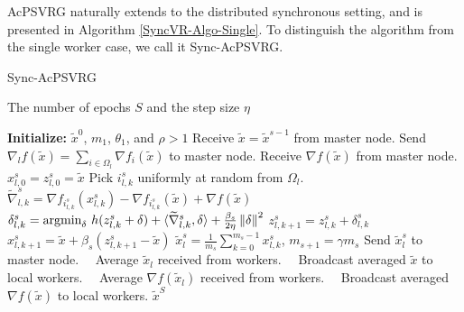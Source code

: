 AcPSVRG naturally extends to the distributed synchronous
setting,  and  is  presented  in  Algorithm  \ref{SyncVR-Algo-Single}.  To  distinguish  the
algorithm from the single worker case, we call it Sync-AcPSVRG. 
\begin{algorithm}[H]
\caption{Sync-AcPSVRG}\label{SyncVR-Algo-Single}
\begin{algorithmic}
\renewcommand{\algorithmicrequire}{\textbf{Input:}}
 \renewcommand{\algorithmicensure}{\textbf{Output:}}
  \newcommand{\INITIALIZE}{\item[\textbf{Initialize:}]}
\REQUIRE The number of epochs $S$ and the step size $\eta$
\INITIALIZE $\widetilde{x}^0$, $m_1$, $\theta_1$, and $\rho > 1$
\STATE Receive $\widetilde{x} = \widetilde{x}^{s-1}$ from master node.
\STATE  Send $\nabla_l f(\widetilde{x}) = \sum_{i\in\Omega_l}\nabla f_i(\widetilde{x})$ to master node.
\STATE  Receive $\nabla f(\widetilde{x})$ from master node.
 \STATE $x_{l,0}^s = z_{l,0}^s = \widetilde{x}$
 \STATE Pick $i_{l,k}^s$ uniformly at random from $\Omega_l$.
 \STATE $\widetilde{\nabla}_{l,k}^s = \nabla f_{i_{l,k}^s}(x_{l,k}^s) - \nabla f_{i_{l,k}^s}(\widetilde{x}) + \nabla f(\widetilde{x})$
 \STATE $\delta_{l,k}^s = \text{argmin}_{\delta}\,\,h(z_{l,k}^s+\delta)+\langle\widetilde{\nabla}_{l,k}^s,\delta\rangle + \frac{{\beta_s}}{2\eta}\left\lVert\delta\right\rVert^2$
 \STATE $z_{l,k+1}^s = z_{l,k}^s + \delta_{l,k}^s$
 \STATE $x_{l,k+1}^s = \widetilde{x}+\beta_s(z_{l,k+1}^s-\widetilde{x})$
 \ENDFOR
\STATE $\widetilde{x}_{l}^s = \frac{1}{m_s}\sum_{k=0}^{m_s-1} x_{l,k}^s$, $m_{s+1} = \gamma m_s$
\STATE Send $\widetilde{x}_{l}^s$ to master node.
 \ENDFOR
 \ENDFOR
 \STATE\qquad\,\,\,\, Average $\widetilde{x}_l$ received from workers.
  \STATE\qquad\,\,\,\, Broadcast averaged $\widetilde{x}$ to local workers.
  \STATE\qquad\,\,\,\, Average $\nabla f(\widetilde{x}_l)$ received from workers.
  \STATE\qquad\,\,\,\, Broadcast averaged $\nabla f(\widetilde{x})$ to local workers.
 \ENSURE $\widetilde{x}^S$
\end{algorithmic}
\end{algorithm}
